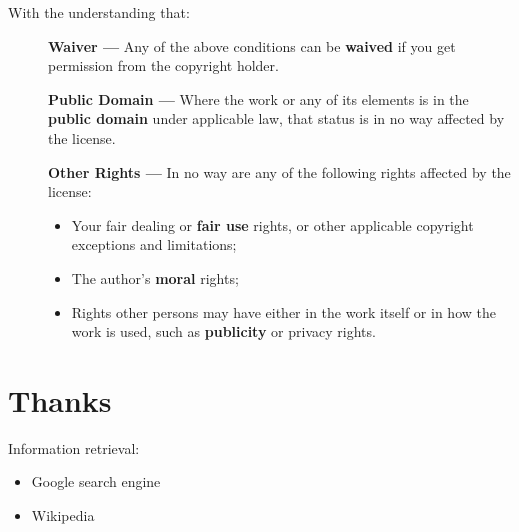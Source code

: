 \documentclass[12pt]{book}
\begin{document}
\vspace{.5cm}
\noindent
With the understanding that:
\begin{description}
\item[] \textbf{Waiver —} Any of the above conditions can be \textbf{waived} if you get permission from the copyright holder.

\item[] \textbf{Public Domain —} Where the work or any of its elements is in the \textbf{public domain} under applicable law, that status is in no way affected by the license.

\item[] \textbf{Other Rights —} In no way are any of the following rights affected by the license:
\begin{itemize}
\item Your fair dealing or \textbf{fair use} rights, or other applicable copyright exceptions and limitations;
\item The author's \textbf{moral} rights;
\item Rights other persons may have either in the work itself or in how the work is used, such as \textbf{publicity} or privacy rights.
\end{itemize}
\end{description}
\normalsize

\chapter*{Thanks}

Information retrieval:
\begin{itemize}
	\item Google search engine
	\item Wikipedia
\end{itemize}
\end{document}
